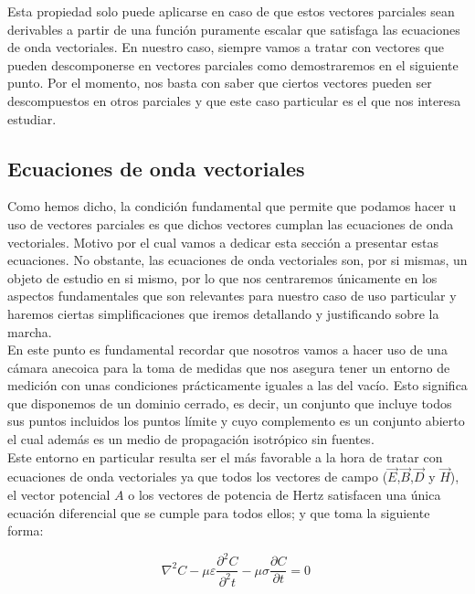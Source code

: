 Esta propiedad solo puede aplicarse en caso de que estos vectores parciales sean derivables a partir de una función puramente escalar que satisfaga las ecuaciones de onda vectoriales.
En nuestro caso, siempre vamos a tratar con vectores que pueden descomponerse en vectores parciales como demostraremos en el siguiente punto. Por el momento, nos basta con saber que ciertos vectores pueden ser descompuestos en otros parciales y que este caso particular es el que nos interesa estudiar.

\subsection{Ecuaciones de onda vectoriales}

Como hemos dicho, la condición fundamental que permite que podamos hacer u uso de vectores parciales es que dichos vectores cumplan las ecuaciones de onda vectoriales. Motivo por el cual vamos a dedicar esta sección a presentar estas ecuaciones. No obstante, las ecuaciones de onda vectoriales son, por si mismas, un objeto de estudio en si mismo, por lo que nos centraremos únicamente en los aspectos fundamentales que son relevantes para nuestro caso de uso particular y haremos ciertas simplificaciones que iremos detallando y justificando sobre la marcha.\\

En este punto es fundamental recordar que nosotros vamos a hacer uso de una cámara anecoica para la toma de medidas que nos asegura tener un entorno de medición con unas condiciones prácticamente iguales a las del vacío. Esto significa que disponemos de un dominio cerrado, es decir, un conjunto que incluye todos sus puntos incluidos los puntos límite y cuyo complemento es un conjunto abierto el cual además es un medio de propagación isotrópico sin fuentes.\\

Este entorno en particular resulta ser el más favorable a la hora de tratar con ecuaciones de onda vectoriales ya que todos los vectores de campo ($\vec{E}$,$\vec{B}$,$\vec{D}$ y $\vec{H}$),  el vector potencial $A$ o  los vectores de potencia de Hertz satisfacen una única ecuación diferencial que se cumple para todos ellos; y que toma la siguiente forma:

\newpage

\begin{equation}
\nabla^2C - \mu\varepsilon\frac{\partial^2C}{\partial^2{t}} - \mu\sigma\frac{\partial C}{\partial{t}} = 0\
\label{eq-esfvec-general}
\end{equation}

